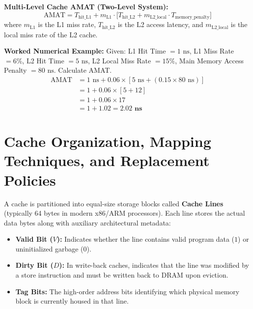 \textbf{Multi-Level Cache AMAT (Two-Level System):}
\begin{equation}
\label{eq:amat_multilevel}
\boxed{\text{AMAT} = T_{\text{hit\_L1}} + m_{\text{L1}} \cdot \Big[ T_{\text{hit\_L2}} + m_{\text{L2\_local}} \cdot T_{\text{memory\_penalty}} \Big]}
\end{equation}
where $m_{\text{L1}}$ is the L1 miss rate, $T_{\text{hit\_L2}}$ is the L2 access latency, and $m_{\text{L2\_local}}$ is the local miss rate of the L2 cache.

\textbf{Worked Numerical Example:}
Given: L1 Hit Time $= 1\text{ ns}$, L1 Miss Rate $= 6\%$, L2 Hit Time $= 5\text{ ns}$, L2 Local Miss Rate $= 15\%$, Main Memory Access Penalty $= 80\text{ ns}$.
Calculate AMAT.
\begin{align*}
\text{AMAT} &= 1\text{ ns} + 0.06 \times [5\text{ ns} + (0.15 \times 80\text{ ns})] \\
            &= 1 + 0.06 \times [5 + 12] \\
            &= 1 + 0.06 \times 17 \\
            &= 1 + 1.02 = \mathbf{2.02\text{ ns}}
\end{align*}


\section{Cache Organization, Mapping Techniques, and Replacement Policies}
\label{sec:cache_mapping}

A cache is partitioned into equal-size storage blocks called \textbf{Cache Lines} (typically 64 bytes in modern x86/ARM processors). Each line stores the actual data bytes along with auxiliary architectural metadata:
\begin{itemize}
    \item \textbf{Valid Bit ($V$):} Indicates whether the line contains valid program data ($1$) or uninitialized garbage ($0$).
    \item \textbf{Dirty Bit ($D$):} In write-back caches, indicates that the line was modified by a store instruction and must be written back to DRAM upon eviction.
    \item \textbf{Tag Bits:} The high-order address bits identifying which physical memory block is currently housed in that line.
\end{itemize}

